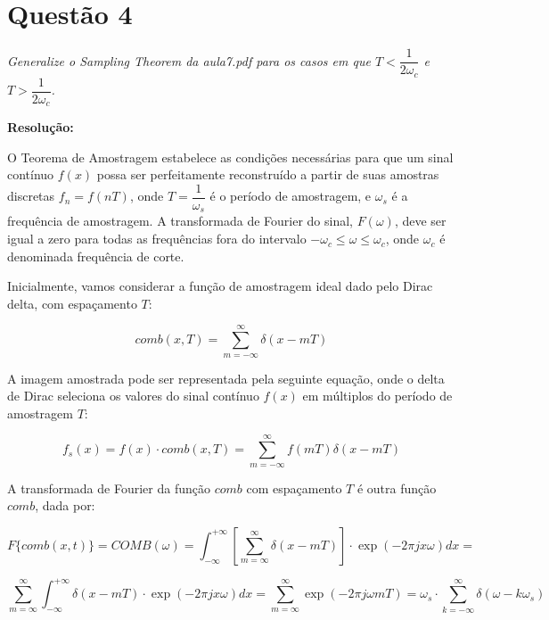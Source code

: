 \documentclass[]{abntex2}
\begin{document}
\section*{\textbf{Questão 4}}

\textit{Generalize o Sampling Theorem da aula7.pdf para os casos em que $T<\dfrac{1}{2{\omega}_c}$ e $T>\dfrac{1}{2{\omega}_c}$.}

\textbf{Resolução:}

O Teorema de Amostragem estabelece as condições necessárias para que um sinal contínuo \( f(x) \) possa ser perfeitamente reconstruído a partir de suas amostras discretas \( f_n = f(nT) \), onde \( T = \dfrac{1}{\omega_s} \) é o período de amostragem, e \( \omega_s \) é a frequência de amostragem. A transformada de Fourier do sinal, \( F(\omega) \), deve ser igual a zero para todas as frequências fora do intervalo \( -\omega_c \leq \omega \leq \omega_c \), onde \( \omega_c \) é denominada frequência de corte.

Inicialmente, vamos considerar a função de amostragem ideal dado pelo Dirac delta, com espaçamento $T$:

\begin{equation*}
    comb(x,T) = \sum_{m=- \infty}^{\infty} \delta (x - mT)
\end{equation*}

A imagem amostrada pode ser representada pela seguinte equação, onde o delta de Dirac seleciona os valores do sinal contínuo \( f(x) \) em múltiplos do período de amostragem \( T \):

\begin{equation*}
    f_s(x) = f(x) \cdot comb(x, T) = \sum_{m=- \infty}^{\infty} f(mT) \delta (x - mT)
\end{equation*}

A transformada de Fourier da função \( comb \) com espaçamento \( T \) é outra função \( comb \), dada por:

\begin{equation*}
    F\{comb(x,t)\} = COMB(\omega) = \int_{-\infty}^{+\infty} [\sum_{m=\infty}^{\infty} \delta (x - mT) ]\cdot \exp(-2\pi j x \omega)dx = 
\end{equation*}

\begin{equation*}
	\sum_{m=\infty}^{\infty} \int_{-\infty}^{+\infty} \delta (x - mT) \cdot \exp(-2\pi j x \omega)dx = \sum_{m=\infty}^{\infty} \exp(-2\pi j\omega mT) =\omega_{s} \cdot \sum_{k=- \infty}^{\infty} \delta (\omega - k\omega_{s})
\end{equation*}
\end{document}
